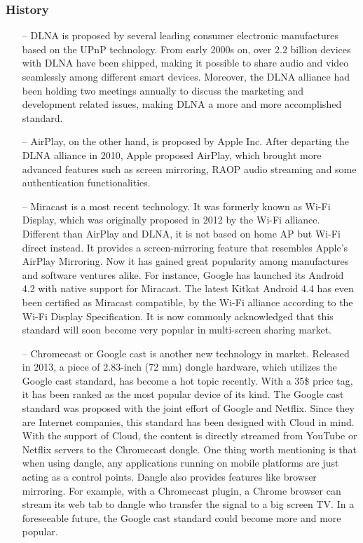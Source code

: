 \subsubsection{History} 
\begin{itemize} 
\item[--]DLNA is proposed by several leading consumer electronic manufactures based on the UPnP 
technology. From early 2000s on, over 2.2 billion devices with DLNA have been shipped, 
making it possible to share audio and video seamlessly among different smart devices. Moreover, the DLNA alliance had been holding two meetings annually to discuss the marketing and development related issues, making DLNA a more and more accomplished standard. 

\item[--]AirPlay, on the other hand, is proposed by Apple Inc. After departing the DLNA alliance in 2010, Apple proposed AirPlay, which brought more advanced features such as screen mirroring, RAOP audio streaming and some authentication functionalities. 
\item[--]Miracast is a most recent technology. It was formerly known as Wi-Fi Display, which was originally proposed in 2012 by the Wi-Fi alliance. Different than AirPlay and DLNA, it is not based on home AP but Wi-Fi direct instead. It provides a screen-mirroring feature that resembles Apple's AirPlay Mirroring. Now it has gained great popularity among manufactures and software ventures alike. For instance, Google has launched its Android 4.2 with native support for Miracast. The latest Kitkat Android 4.4 has even been certified as Miracast compatible, by the Wi-Fi alliance according to the Wi-Fi Display Specification. It is now commonly acknowledged that this standard will soon become very popular in multi-screen sharing market. 
\item[--]Chromecast or Google cast is another new technology in 
market. Released in 2013, a piece of 2.83-inch (72 mm) dongle hardware, which utilizes the Google cast standard, has become a hot topic recently. With a 35\$ price tag, it has been ranked as the most 
popular device of its kind. The Google cast standard was proposed with the joint effort of 
Google and Netflix. Since they are Internet companies, this standard has been 
designed with Cloud in mind. With the support of Cloud, the content is directly streamed from YouTube or Netflix servers to the Chromecast dongle. One thing worth mentioning is that when using dangle, any applications running on mobile platforms are just acting as a control points. Dangle also provides features like browser mirroring. For example, with a Chromecast plugin, a Chrome browser can stream its web tab to dangle who transfer the signal to a big screen TV. In a foreseeable future, the Google cast standard could become more and more popular. 
\end{itemize} 
